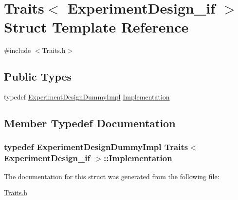 \hypertarget{struct_traits_3_01_experiment_design__if_01_4}{}\section{Traits$<$ Experiment\+Design\+\_\+if $>$ Struct Template Reference}
\label{struct_traits_3_01_experiment_design__if_01_4}


{\ttfamily \#include $<$Traits.\+h$>$}

\subsection*{Public Types}
\begin{DoxyCompactItemize}
\item 
typedef \hyperlink{class_experiment_design_dummy_impl}{Experiment\+Design\+Dummy\+Impl} \hyperlink{struct_traits_3_01_experiment_design__if_01_4_a48e78569c5d3ec214ad6ac26071e73bb}{Implementation}
\end{DoxyCompactItemize}


\subsection{Member Typedef Documentation}
\subsubsection[{\texorpdfstring{Implementation}{Implementation}}]{\setlength{\rightskip}{0pt plus 5cm}typedef {\bf Experiment\+Design\+Dummy\+Impl} {\bf Traits}$<$ {\bf Experiment\+Design\+\_\+if} $>$\+::{\bf Implementation}}\hypertarget{struct_traits_3_01_experiment_design__if_01_4_a48e78569c5d3ec214ad6ac26071e73bb}{}\label{struct_traits_3_01_experiment_design__if_01_4_a48e78569c5d3ec214ad6ac26071e73bb}


The documentation for this struct was generated from the following file\+:\begin{DoxyCompactItemize}
\item 
\hyperlink{_traits_8h}{Traits.\+h}\end{DoxyCompactItemize}
